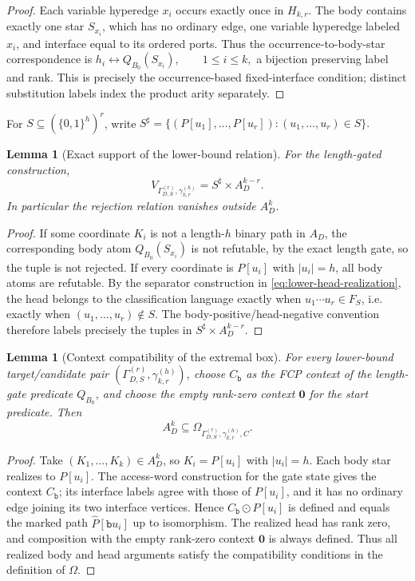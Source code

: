 \documentclass[11pt]{article}
\newtheorem{lemma}[theorem]{Lemma}
\theoremstyle{definition}
\theoremstyle{remark}
\begin{document}
\begin{proof}
Each variable hyperedge \(x_i\) occurs exactly once in \(H_{k,r}\).  The body
contains exactly one star \(S_{x_i}\), which has no ordinary edge, one
variable hyperedge labeled \(x_i\), and interface equal to its ordered ports.
Thus the occurrence-to-body-star correspondence is
\(h_i\longleftrightarrow Q_{B_0}(S_{x_i}), \qquad 1\le i\le k,\)
a bijection preserving label and rank.  This is precisely the
occurrence-based fixed-interface condition; distinct substitution labels index
the product arity separately.
\end{proof}

For \(S\subseteq(\{0,1\}^h)^r\), write
\(S^\sharp = \{(P[u_1],\ldots,P[u_r]):(u_1,\ldots,u_r)\in S\}.\)

\begin{lemma}[Exact support of the lower-bound relation]
\label{lem:exact-support}
For the length-gated construction,
\[
\boxed{
V_{\Gamma_{D,S}^{(r)},\gamma_{k,r}^{(h)}}
=
S^\sharp\times A_D^{k-r}.
}
\]
In particular the rejection relation vanishes outside \(A_D^k\).
\end{lemma}

\begin{proof}
If some coordinate \(K_i\) is not a length-\(h\) binary path in \(A_D\), the
corresponding body atom \(Q_{B_0}(S_{x_i})\) is not refutable, by the exact
length gate, so the tuple is not rejected.  If every coordinate is
\(P[u_i]\) with \(|u_i|=h\), all body atoms are refutable.  By the separator
construction in \eqref{eq:lower-head-realization}, the head belongs to the
classification language exactly
when \(u_1\cdots u_r\in F_S\), i.e. exactly when
\((u_1,\ldots,u_r)\notin S\).  The body-positive/head-negative convention
therefore labels precisely the tuples in \(S^\sharp\times A_D^{k-r}\).
\end{proof}

\begin{lemma}[Context compatibility of the extremal box]
\label{lem:extremal-box-compatible}
For every lower-bound target/candidate pair
\((\Gamma_{D,S}^{(r)},\gamma_{k,r}^{(h)})\), choose
\(C_{\mathtt b}\) as the FCP context of the length-gate predicate
\(Q_{B_0}\), and choose the empty rank-zero context \(\mathbf 0\) for the
start predicate.  Then
\[
\boxed{
A_D^k
\subseteq
\Omega_{\Gamma_{D,S}^{(r)},\gamma_{k,r}^{(h)},C}.
}
\]
\end{lemma}

\begin{proof}
Take \((K_1,\ldots,K_k)\in A_D^k\), so
\(K_i=P[u_i]\) with \(|u_i|=h\).  Each body star realizes to
\(P[u_i]\).  The access-word construction for the gate state gives the
context \(C_{\mathtt b}\); its interface labels agree with those of
\(P[u_i]\), and it has no ordinary edge joining its two interface vertices.
Hence \(C_{\mathtt b}\odot P[u_i]\) is defined and equals the marked path
\(\widehat P[\mathtt b u_i]\) up to isomorphism.  The realized head has rank
zero, and composition with the empty rank-zero context \(\mathbf 0\) is
always defined.  Thus all realized body and head arguments satisfy the
compatibility conditions in the definition of \(\Omega\).
\end{proof}
\end{document}
